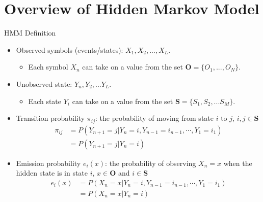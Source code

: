 \documentclass{beamer}
\begin{document}
\section{Overview of Hidden Markov Model}
\begin{frame}{HMM Definition}
	\begin{itemize}
		\item Observed symbols (events/states): $X_1, X_2, ..., X_L$.
		\begin{itemize}
			\item Each symbol $X_n$ can take on a value from the set $\textbf{O} = \{ O_1,..., O_N\}$.
		\end{itemize}
		\item Unobserved state: $Y_n, Y_2,...Y_L$.
		\begin{itemize}
			\item Each state $Y_i$ can take on a value from the set $\textbf{S} = \{S_1, S_2,...S_M\}$.
		\end{itemize}
		\item Transition probability $\pi_{ij}$: the probability of moving from state $i$ to $j$, $i,j \in \textbf{S}$
		\begin{equation}
			\begin{split}
				\pi_{ij} & = P(Y_{n+1} = j \vert Y_n = i, Y_{n-1} = i_{n-1},\cdots, Y_1 = i_1) \\
				& = P(Y_{n+1} = j \vert Y_n = i)
			\end{split}
		\end{equation}
		\item Emission probability $e_i(x)$: the probability of observing $X_n = x$ when the hidden state is in state $i$, $x \in \textbf{O}$ and $i \in \textbf{S}$
		\begin{equation}
			\begin{split}
				e_{i}(x) & = P(X_n = x \vert Y_n = i, Y_{n-1} = i_{n-1},\cdots, Y_1 = i_1) \\
				& = P(X_n = x \vert Y_n = i) 
			\end{split}
		\end{equation}
	\end{itemize}
\end{frame}
\end{document}
